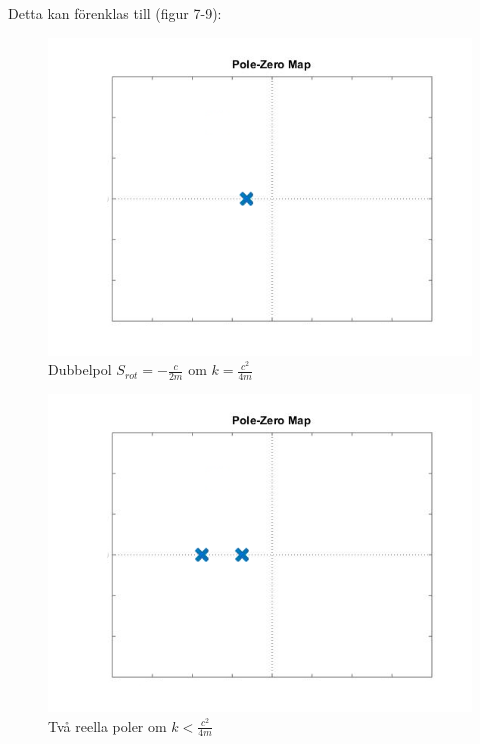 \documentclass[10pt,a4paper]{article}
\begin{document}
Detta kan förenklas till (figur 7-9):

\begin{figure}
\begin{center}
\includegraphics[scale=0.3]{1reell}
\caption{Dubbelpol $S_{rot}=-\frac{c}{2m}$ om $k=\frac{c^2}{4m}$}
\end{center}
\end{figure}

\begin{figure}
\begin{center}
\includegraphics[scale=0.3]{2reella}
\caption{Två reella poler om $k<\frac{c^2}{4m}$}
\end{center}
\end{figure}
\end{document}
